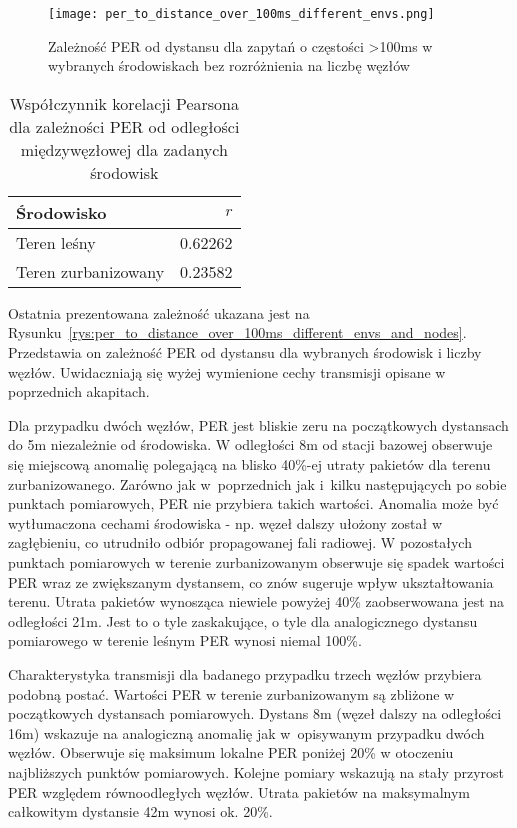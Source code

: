 \begin{figure}[!htb]
	\centering \texttt{[image: per\_to\_distance\_over\_100ms\_different\_envs.png]} 
	\caption{Zależność \gls{PER} od dystansu dla zapytań o częstości >100ms w wybranych środowiskach bez rozróżnienia na liczbę węzłów}
	\label{rys:per_to_distance_over_100ms_different_envs}
\end{figure}

\begin{table}[!ht]
\centering
	\begin{tabular}{p{4.5cm}|r}
	Środowisko              & $r$             \\\hline
	Teren leśny             & 0.62262         \\\hline
	Teren zurbanizowany     & 0.23582         \\\hline
	\end{tabular}
\caption{\label{tab:corr_between_per_and_env}Współczynnik korelacji Pearsona dla zależności PER od odległości międzywęzłowej dla zadanych środowisk}
\end{table}

Ostatnia prezentowana zależność ukazana jest na Rysunku~\ref{rys:per_to_distance_over_100ms_different_envs_and_nodes}.
Przedstawia on zależność PER od dystansu dla wybranych środowisk i liczby węzłów. Uwidaczniają się wyżej wymienione
cechy transmisji opisane w poprzednich akapitach.

Dla przypadku dwóch węzłów, PER jest bliskie zeru na początkowych dystansach do 5m niezależnie od środowiska. W odległości 8m
od stacji bazowej obserwuje się miejscową anomalię polegającą na blisko 40\%-ej utraty pakietów dla terenu zurbanizowanego.
Zarówno jak w~poprzednich jak i~kilku następujących po sobie punktach pomiarowych, PER nie przybiera takich wartości. Anomalia może
być wytłumaczona cechami środowiska - np. węzeł dalszy ułożony został w zagłębieniu, co utrudniło odbiór propagowanej fali
radiowej. W pozostałych punktach pomiarowych w terenie zurbanizowanym obserwuje się spadek wartości PER wraz ze zwiększanym dystansem,
co znów sugeruje wpływ ukształtowania terenu. Utrata pakietów wynosząca niewiele powyżej 40\% zaobserwowana jest na odległości
21m. Jest to o tyle zaskakujące, o tyle dla analogicznego dystansu pomiarowego w terenie leśnym PER wynosi niemal 100\%.

Charakterystyka transmisji dla badanego przypadku trzech węzłów przybiera podobną postać. Wartości PER w terenie zurbanizowanym są zbliżone
w początkowych dystansach pomiarowych. Dystans 8m (węzeł dalszy na odległości 16m) wskazuje na analogiczną anomalię jak w~opisywanym
przypadku dwóch węzłów. Obserwuje się maksimum lokalne PER poniżej 20\% w otoczeniu najbliższych punktów pomiarowych. Kolejne pomiary
wskazują na stały przyrost PER względem równoodległych węzłów. Utrata pakietów na maksymalnym całkowitym dystansie 42m wynosi ok. 20\%.

